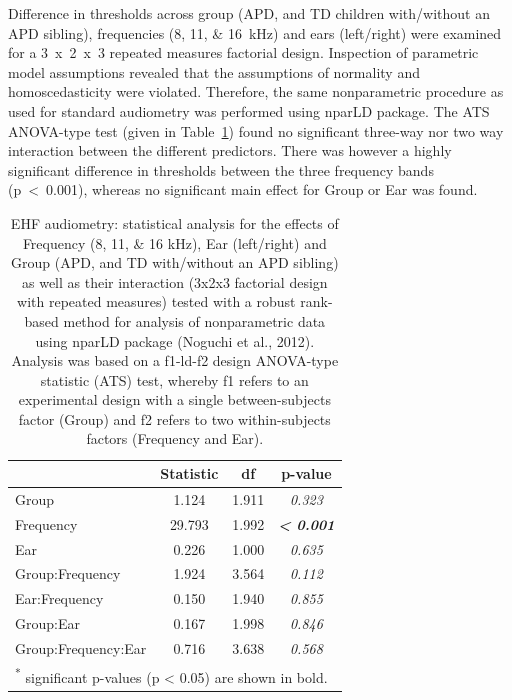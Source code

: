 \documentclass[a4paper, twoside]{templates/ociamthesis}
\begin{document}
Difference in thresholds across group (APD, and TD children with/without an APD sibling), frequencies (8, 11, \& 16~kHz) and ears (left/right) were examined for a 3~x~2~x~3 repeated measures factorial design. Inspection of parametric model assumptions revealed that the assumptions of normality and homoscedasticity were violated. Therefore, the same nonparametric procedure as used for standard audiometry was performed using nparLD package. The ATS ANOVA-type test (given in Table~\ref{tab:EHF-TabnparLD}) found no significant three-way nor two way interaction between the different predictors. There was however a highly significant difference in thresholds between the three frequency bands (p~\textless~0.001), whereas no significant main effect for Group or Ear was found.\\

\begin{table}

\caption{\label{tab:EHF-TabnparLD}EHF audiometry: statistical analysis for the effects of Frequency (8, 11, \& 16 kHz), Ear (left/right) and Group (APD, and TD with/without an APD sibling) as well as their interaction (3x2x3 factorial design with repeated measures) tested with a robust rank-based method for analysis of nonparametric data using nparLD package (Noguchi et al., 2012). Analysis was based on a f1-ld-f2 design ANOVA-type statistic (ATS) test, whereby f1 refers to an experimental design with a single between-subjects factor (Group) and f2 refers to two within-subjects factors (Frequency and Ear).}
\centering
\begin{tabular}[t]{lcc>{}c}
\toprule
  & Statistic & df & p-value\\
\midrule
Group & 1.124 & 1.911 & \em{0.323}\\
Frequency & 29.793 & 1.992 & \em{\textbf{< 0.001}}\\
Ear & 0.226 & 1.000 & \em{0.635}\\
Group:Frequency & 1.924 & 3.564 & \em{0.112}\\
Ear:Frequency & 0.150 & 1.940 & \em{0.855}\\
Group:Ear & 0.167 & 1.998 & \em{0.846}\\
Group:Frequency:Ear & 0.716 & 3.638 & \em{0.568}\\
\bottomrule
\multicolumn{4}{l}{\textsuperscript{*} significant p-values (p < 0.05) are shown in bold.}\\
\end{tabular}
\end{table}
\end{document}
